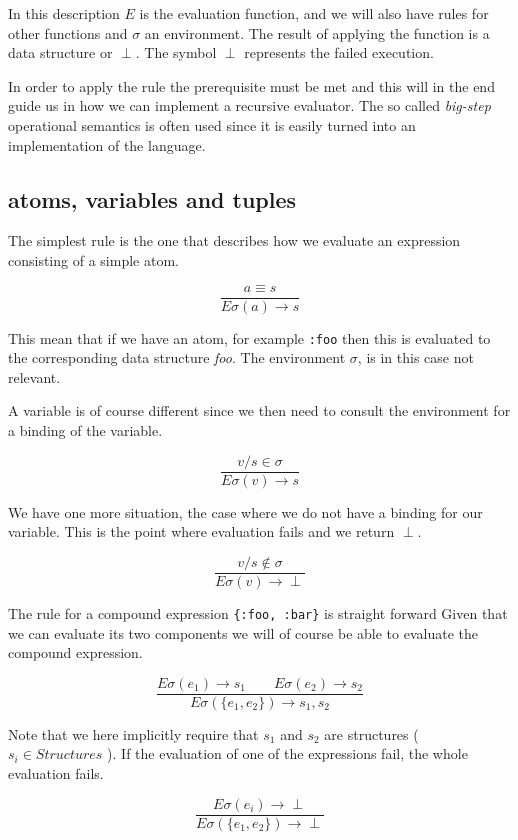 \documentclass[a4paper,11pt]{article}
\begin{document}
In this description $E$ is the evaluation function, and we will also
have rules for other functions and $\sigma$ an environment. The result
of applying the function is a data structure or $\perp$. The symbol
$\perp$ represents the failed execution.

In order to apply the rule the prerequisite must be met and this will
in the end guide us in how we can implement a recursive evaluator. The
so called {\em big-step} operational semantics is often used since it
is easily turned into an implementation of the language.

\subsection{atoms, variables and tuples}

The simplest rule is the one that describes how we evaluate an
expression consisting of a simple atom.

$$\frac{a \equiv s}{E\sigma(a) \rightarrow s}$$  

This mean that if we have an atom, for example {\tt :foo} then this is
evaluated to the corresponding data structure {\em foo}. The
environment $\sigma$, is in this case not relevant. 

A variable is of course different since we then need to consult the
environment for a binding of the variable.

   $$\frac{v/s \in \sigma}{E\sigma(v) \rightarrow s}$$

We have one more situation, the case where we do not have a binding
for our variable. This is the point where evaluation fails and we return $\perp$.

   $$\frac{v/s \not\in \sigma}{E\sigma(v) \rightarrow \perp}$$
   
   
The rule for a compound expression {\tt \{:foo, :bar\}} is straight
forward Given that we can evaluate its two components we will of
course be able to evaluate the compound expression.

$$\frac{ E\sigma(e_1) \rightarrow s_1 \qquad   E\sigma(e_2) \rightarrow s_2}{E\sigma(\lbrace e_1 , e_2\rbrace) \rightarrow {s_1, s_2}}$$

Note that we here implicitly require that $s_1$ and $s_2$ are
structures ( $ s_i \in Structures$ ). If the evaluation of one of the expressions fail, the whole evaluation fails. 

$$\frac{ E\sigma(e_i) \rightarrow \perp }{E\sigma(\lbrace e_1 , e_2\rbrace) \rightarrow \perp}$$
\end{document}
